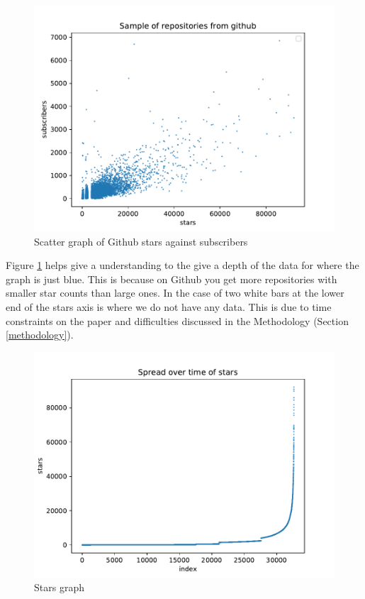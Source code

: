 \documentclass[twoside,12pt,titlepage,a4paper]{article}
\begin{document}
\begin{figure}[!ht]
  \centering
  \includegraphics[width=\textwidth]{../src/results/sub vs stars.pdf}
  \caption[alt text]{Scatter graph of Github stars against subscribers}
  \label{graph_scatter_stars_vs_subs}
\end{figure}

Figure \ref{graph_scatter_stars_vs_subs} helps give a understanding to the give a depth of the data for where the graph is just blue. This is because on Github you get more repositories with smaller star counts than large ones.
In the case of two white bars at the lower end of the stars axis is where we do not have any data. This is due to time constraints on the paper and difficulties discussed in the Methodology (Section \ref{methodology}).

\begin{figure}[!ht]
  \centering
  \includegraphics[width=\textwidth]{../src/results/spread over time.pdf}
  \caption[alt text]{Stars graph}
  \label{graph_scatter_stars_line}
\end{figure}
\end{document}
